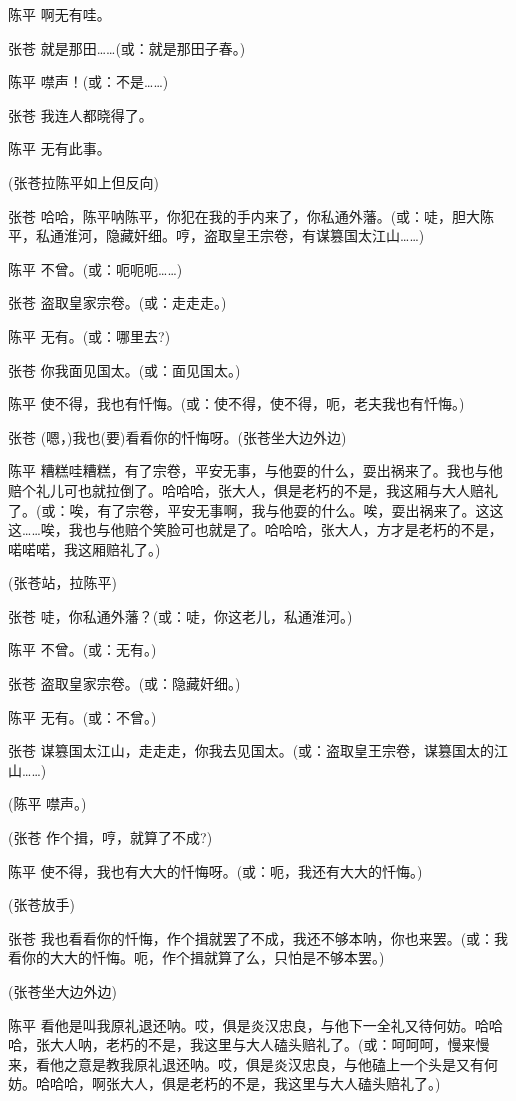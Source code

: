 陈平 啊无有哇。

张苍 就是那田\ldots{}\ldots{}(或：就是那田子春。)

陈平 噤声！(或：不是\ldots{}\ldots{})

张苍 我连人都晓得了。

陈平 无有此事。

(张苍拉陈平如上但反向)

张苍
哈哈，陈平呐陈平，你犯在我的手内来了，你私通外藩。(或：唗，胆大陈平，私通淮河，隐藏奸细。哼，盗取皇王宗卷，有谋篡国太江山\ldots{}\ldots{})

陈平 不曾。(或：呃呃呃\ldots{}\ldots{})

张苍 盗取皇家宗卷。(或：走走走。)

陈平 无有。(或：哪里去?)

张苍 你我面见国太。(或：面见国太。)

陈平 使不得，我也有忏悔。(或：使不得，使不得，呃，老夫我也有忏悔。)

张苍 (嗯，)我也(要)看看你的忏悔呀。(张苍坐大边外边)

陈平
糟糕哇糟糕，有了宗卷，平安无事，与他耍的什么，耍出祸来了。我也与他赔个礼儿可也就拉倒了。哈哈哈，张大人，俱是老朽的不是，我这厢与大人赔礼了。(或：唉，有了宗卷，平安无事啊，我与他耍的什么。唉，耍出祸来了。这这这\ldots{}\ldots{}唉，我也与他赔个笑脸可也就是了。哈哈哈，张大人，方才是老朽的不是，喏喏喏，我这厢赔礼了。)

(张苍站，拉陈平)

张苍 唗，你私通外藩？(或：唗，你这老儿，私通淮河。)

陈平 不曾。(或：无有。)

张苍 盗取皇家宗卷。(或：隐藏奸细。)

陈平 无有。(或：不曾。)

张苍
谋篡国太江山，走走走，你我去见国太。(或：盗取皇王宗卷，谋篡国太的江山\ldots{}\ldots{})

(陈平 噤声。)

(张苍 作个揖，哼，就算了不成?)

陈平 使不得，我也有大大的忏悔呀。(或：呃，我还有大大的忏悔。)

(张苍放手)

张苍
我也看看你的忏悔，作个揖就罢了不成，我还不够本呐，你也来罢。(或：我看你的大大的忏悔。呃，作个揖就算了么，只怕是不够本罢。)

(张苍坐大边外边)

陈平
看他是叫我原礼退还呐。哎，俱是炎汉忠良，与他下一全礼又待何妨。哈哈哈，张大人呐，老朽的不是，我这里与大人磕头赔礼了。(或：呵呵呵，慢来慢来，看他之意是教我原礼退还呐。哎，俱是炎汉忠良，与他磕上一个头是又有何妨。哈哈哈，啊张大人，俱是老朽的不是，我这里与大人磕头赔礼了。)

